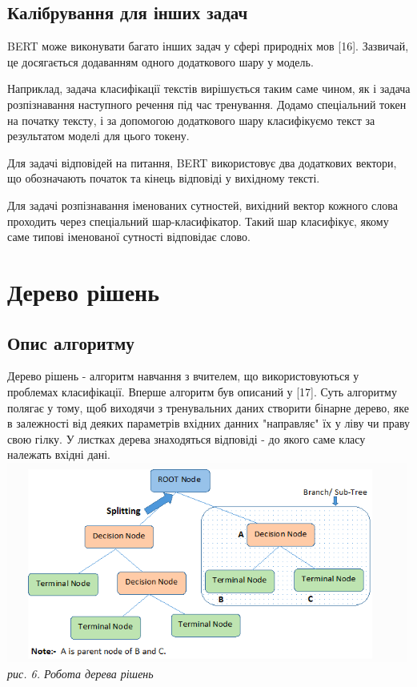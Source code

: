 \subsection{Калібрування для інших задач}
 BERT може виконувати багато інших задач у сфері природніх мов [16]. Зазвичай, це досягається додаванням одного додаткового шару у модель. 
 
 Наприклад, задача класифікації текстів вирішується таким саме чином, як і задача розпізнавання наступного речення під час тренування. Додамо спеціальний токен на початку тексту, і за допомогою додаткового шару класифікуємо текст за результатом моделі для цього токену.
 
 Для задачі відповідей на питання, BERT використовує два додаткових вектори, що обозначають початок та кінець відповіді у вихідному тексті.
 
 Для задачі розпізнавання іменованих сутностей, вихідний вектор кожного слова проходить через спеціальний шар-класифікатор. Такий шар класифікує, якому саме типові іменованої сутності  відповідає слово.
 \newpage
\section{Дерево рішень}
\subsection{Опис алгоритму}
Дерево рішень - алгоритм навчання з вчителем, що використовуються у проблемах класифікації. Вперше алгоритм був описаний у [17]. Суть алгоритму полягає у тому, щоб виходячи з тренувальних даних створити бінарне дерево, яке в залежності від деяких параметрів вхідних данних "направляє" їх у ліву чи праву свою гілку. У листках дерева знаходяться відповіді - до якого саме класу належать вхідні дані. \\
\includegraphics[width = 500]{Dissertation/decision_tree.png} \\
\textit{рис. 6.  Робота дерева рішень}

